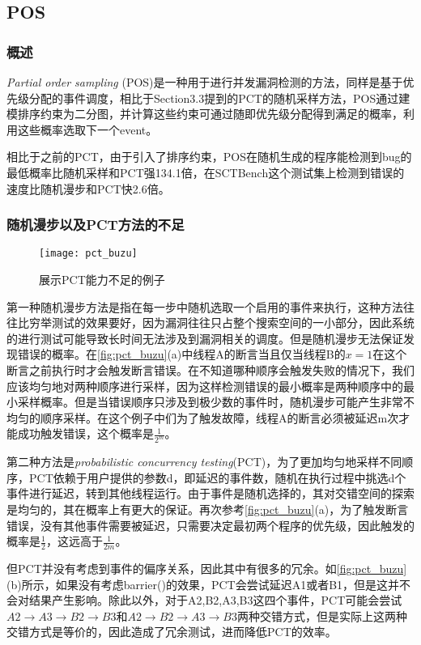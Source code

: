 \subsection{POS}

\subsubsection{概述}

\textit{Partial order sampling} (POS)是一种用于进行并发漏洞检测的方法，同样是基于优先级分配的事件调度，相比于Section3.3提到的PCT的随机采样方法，POS通过建模排序约束为二分图，并计算这些约束可通过随即优先级分配得到满足的概率，利用这些概率选取下一个event。

相比于之前的PCT，由于引入了排序约束，POS在随机生成的程序能检测到bug的最低概率比随机采样和PCT强134.1倍，在SCTBench这个测试集上检测到错误的速度比随机漫步和PCT快2.6倍。

\subsubsection{随机漫步以及PCT方法的不足}

\begin{figure}[ht]
    \centering
    \texttt{[image: pct\_buzu]}
    \caption{\label{fig:pct_buzu}展示PCT能力不足的例子}
\end{figure}

第一种随机漫步方法是指在每一步中随机选取一个启用的事件来执行，这种方法往往比穷举测试的效果要好，因为漏洞往往只占整个搜索空间的一小部分，因此系统的进行测试可能导致长时间无法涉及到漏洞相关的调度。但是随机漫步无法保证发现错误的概率。在\autoref{fig:pct_buzu}(a)中线程A的断言当且仅当线程B的$x = 1$在这个断言之前执行时才会触发断言错误。在不知道哪种顺序会触发失败的情况下，我们应该均匀地对两种顺序进行采样，因为这样检测错误的最小概率是两种顺序中的最小采样概率。但是当错误顺序只涉及到极少数的事件时，随机漫步可能产生非常不均匀的顺序采样。在这个例子中们为了触发故障，线程A的断言必须被延迟m次才能成功触发错误，这个概率是$\frac{1}{2^m}$。

第二种方法是\textit{probabilistic concurrency testing}(PCT)，为了更加均匀地采样不同顺序，PCT依赖于用户提供的参数d，即延迟的事件数，随机在执行过程中挑选d个事件进行延迟，转到其他线程运行。由于事件是随机选择的，其对交错空间的探索是均匀的，其在概率上有更大的保证。再次参考\autoref{fig:pct_buzu}(a)，为了触发断言错误，没有其他事件需要被延迟，只需要决定最初两个程序的优先级，因此触发的概率是$\frac{1}{2}$，这远高于$\frac{1}{2m}$。

但PCT并没有考虑到事件的偏序关系，因此其中有很多的冗余。如\autoref{fig:pct_buzu}(b)所示，如果没有考虑barrier()的效果，PCT会尝试延迟A1或者B1，但是这并不会对结果产生影响。除此以外，对于A2,B2,A3,B3这四个事件，PCT可能会尝试$A2 \rightarrow A3 \rightarrow B2 \rightarrow B3$和$A2 \rightarrow B2 \rightarrow A3 \rightarrow B3$两种交错方式，但是实际上这两种交错方式是等价的，因此造成了冗余测试，进而降低PCT的效率。

